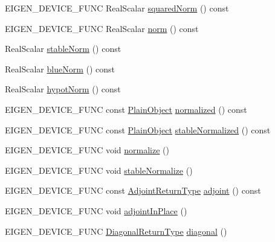 \begin{DoxyCompactItemize}
\item 
E\+I\+G\+E\+N\+\_\+\+D\+E\+V\+I\+C\+E\+\_\+\+F\+U\+NC Real\+Scalar \mbox{\hyperlink{class_eigen_1_1_matrix_base_a8782faeb21e43908cdce47cec06fba23}{squared\+Norm}} () const
\item 
E\+I\+G\+E\+N\+\_\+\+D\+E\+V\+I\+C\+E\+\_\+\+F\+U\+NC Real\+Scalar \mbox{\hyperlink{class_eigen_1_1_matrix_base_a5f6a3bc46add1f2e879ce15040e6987e}{norm}} () const
\item 
Real\+Scalar \mbox{\hyperlink{class_eigen_1_1_matrix_base_ab84d3e64f855813b1eea4202c0697dc1}{stable\+Norm}} () const
\item 
Real\+Scalar \mbox{\hyperlink{class_eigen_1_1_matrix_base_a3f3faa00163c16824ff03e58a210c74c}{blue\+Norm}} () const
\item 
Real\+Scalar \mbox{\hyperlink{class_eigen_1_1_matrix_base_a32222d3b6677e6cdf0b801463f329b72}{hypot\+Norm}} () const
\item 
E\+I\+G\+E\+N\+\_\+\+D\+E\+V\+I\+C\+E\+\_\+\+F\+U\+NC const \mbox{\hyperlink{class_eigen_1_1_dense_base_aae45af9b5aca5a9caae98fd201f47cc4}{Plain\+Object}} \mbox{\hyperlink{class_eigen_1_1_matrix_base_a6ede5c8ebe9631fed9004fedbf9e4016}{normalized}} () const
\item 
E\+I\+G\+E\+N\+\_\+\+D\+E\+V\+I\+C\+E\+\_\+\+F\+U\+NC const \mbox{\hyperlink{class_eigen_1_1_dense_base_aae45af9b5aca5a9caae98fd201f47cc4}{Plain\+Object}} \mbox{\hyperlink{class_eigen_1_1_matrix_base_a218ec9c7827f714c965df0865b420728}{stable\+Normalized}} () const
\item 
E\+I\+G\+E\+N\+\_\+\+D\+E\+V\+I\+C\+E\+\_\+\+F\+U\+NC void \mbox{\hyperlink{class_eigen_1_1_matrix_base_a1a2dd2fd1597ee6d51098aa3bb7c86f4}{normalize}} ()
\item 
E\+I\+G\+E\+N\+\_\+\+D\+E\+V\+I\+C\+E\+\_\+\+F\+U\+NC void \mbox{\hyperlink{class_eigen_1_1_matrix_base_aaf1f5a729324eecc1399591ce9324e9a}{stable\+Normalize}} ()
\item 
E\+I\+G\+E\+N\+\_\+\+D\+E\+V\+I\+C\+E\+\_\+\+F\+U\+NC const \mbox{\hyperlink{struct_eigen_1_1internal_1_1true__type}{Adjoint\+Return\+Type}} \mbox{\hyperlink{class_eigen_1_1_matrix_base_afacca1f88da57e5cd87dd07c8ff926bb}{adjoint}} () const
\item 
E\+I\+G\+E\+N\+\_\+\+D\+E\+V\+I\+C\+E\+\_\+\+F\+U\+NC void \mbox{\hyperlink{class_eigen_1_1_matrix_base_a51c5982c1f64e45a939515b701fa6f4a}{adjoint\+In\+Place}} ()
\item 
E\+I\+G\+E\+N\+\_\+\+D\+E\+V\+I\+C\+E\+\_\+\+F\+U\+NC \mbox{\hyperlink{class_eigen_1_1_diagonal}{Diagonal\+Return\+Type}} \mbox{\hyperlink{class_eigen_1_1_matrix_base_ab5768147536273eb2dbdfa389cfd26a3}{diagonal}} ()

\end{DoxyCompactItemize}
